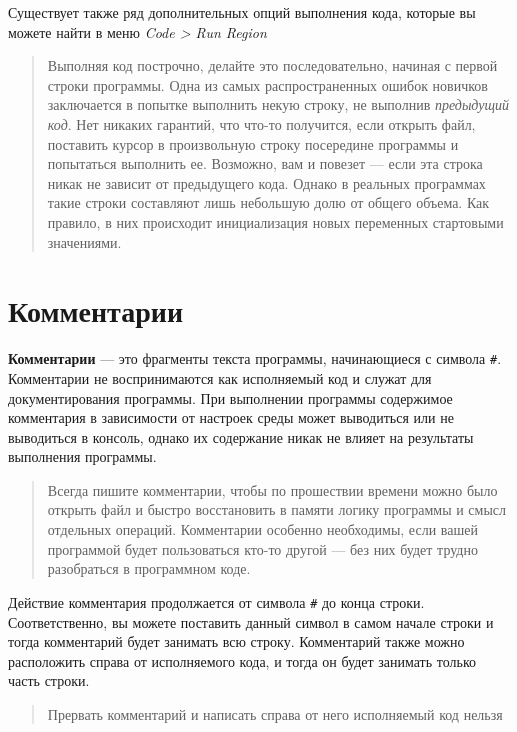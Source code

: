 \documentclass[]{book}
\begin{document}
Существует также ряд дополнительных опций выполнения кода, которые вы
можете найти в меню \emph{Code \textgreater{} Run Region}

\begin{quote}
Выполняя код построчно, делайте это последовательно, начиная с первой
строки программы. Одна из самых распространенных ошибок новичков
заключается в попытке выполнить некую строку, не выполнив
\emph{предыдущий код}. Нет никаких гарантий, что что-то получится, если
открыть файл, поставить курсор в произвольную строку посередине
программы и попытаться выполнить ее. Возможно, вам и повезет --- если
эта строка никак не зависит от предыдущего кода. Однако в реальных
программах такие строки составляют лишь небольшую долю от общего объема.
Как правило, в них происходит инициализация новых переменных стартовыми
значениями.
\end{quote}

\section*{Комментарии}

\textbf{Комментарии} --- это фрагменты текста программы, начинающиеся с
символа \texttt{\#}. Комментарии не воспринимаются как исполняемый код и
служат для документирования программы. При выполнении программы
содержимое комментария в зависимости от настроек среды может выводиться
или не выводиться в консоль, однако их содержание никак не влияет на
результаты выполнения программы.

\begin{quote}
Всегда пишите комментарии, чтобы по прошествии времени можно было
открыть файл и быстро восстановить в памяти логику программы и смысл
отдельных операций. Комментарии особенно необходимы, если вашей
программой будет пользоваться кто-то другой --- без них будет трудно
разобраться в программном коде.
\end{quote}

Действие комментария продолжается от символа \texttt{\#} до конца
строки. Соответственно, вы можете поставить данный символ в самом начале
строки и тогда комментарий будет занимать всю строку. Комментарий также
можно расположить справа от исполняемого кода, и тогда он будет занимать
только часть строки.

\begin{quote}
Прервать комментарий и написать справа от него исполняемый код нельзя
\end{quote}
\end{document}
